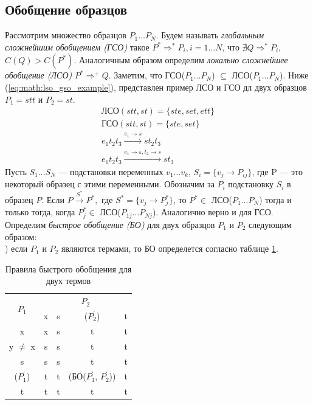 \documentclass[12pt]{article}
\begin{document}
\subsection[Обобщение образцов]{\large Обобщение образцов}
\hspace{\parindent} Рассмотрим множество образцов $P_1 \ldots P_N$. Будем называть \textit{глобальным сложнейшим обобщением (ГСО)} такое $P^*\Rightarrow^*P_i, i = 1 \ldots N$, что $\nexists Q \Rightarrow^* P_i,$ $C(Q) > C(P^*)$. Аналогичным образом определим \textit{локально сложнейшее обобщение (ЛСО)} $P^*\Rightarrow^+ Q$. Заметим, что ГСО($P_1 \ldots P_N$) $\subseteq$ ЛСО($P_1 \ldots P_N$). Ниже (\ref{eq:math:lso_gso_example}), представлен пример ЛСО и ГСО дл двух образцов $P_1 = stt$ и $P_2 = st$.
\begin{equation}\label{eq:math:lso_gso_example}
\begin{array}{l}
\textrm{ЛСО}(stt, st) = \{ste, set, ett\} \\
\textrm{ГСО}(stt, st) = \{ste, set\} \\
e_1 t_2 t_3 \xrightarrow{e_1 \to s} s t_2 t_3 \\
e_1 t_2 t_3 \xrightarrow{e_1 \to \varepsilon, t_2 \to s} s t_3
\end{array}
\end{equation} 
\indent Пусть $S_1 \ldots S_N$ --- подстановки переменных $v_1 \ldots v_k$, $S_i = \{v_j \rightarrow P_{ij}\}$, где P --- это некоторый образец с этими переменными. Обозначим за $P_i$ подстановку $S_i$ в образец $P$. Если $P \xrightarrow{S^*} P^* ,$ где $S^* = \{v_j \rightarrow P^*_j\}$, то $P^* \in$ ЛСО($P_1 \ldots P_N$) тогда и только тогда, когда $P^*_j \in$ ЛСО($P_{1j} \ldots P_{Nj}$). Аналогично верно и для ГСО.\\
\indent Определим \textit{быстрое обобщение (БО)} для двух образцов $P_1$ и $P_2$ следующим образом:\\
) если $P_1$ и $P_2$ являются термами, то БО определется согласно таблице \ref{tab:bo}.
\begin{table}[h]
\caption{\label{tab:bo}Правила быстрого обобщения для двух термов}
\begin{center}
\begin{tabular}{|c|c|c|c|c|}
\hline
\multirow{2}{*}{$P_1$}   & \multicolumn{4}{c|}{$P_2$}                                                                                                 \\ \cline{2-5} 
                        & x & s & ($P_2^'$) & t \\ \hline
x & x & s & t & t \\ \hline
y $\neq$ x & s & s & t & t \\ \hline
s & s & s & t & t \\ \hline
($P_1^'$) & t & t & (БО($P_1^'$, $P_2^'$)) & t \\ \hline
t & t & t & t & t \\ \hline
\end{tabular}
\end{center}
\end{table}\\
\end{document}

